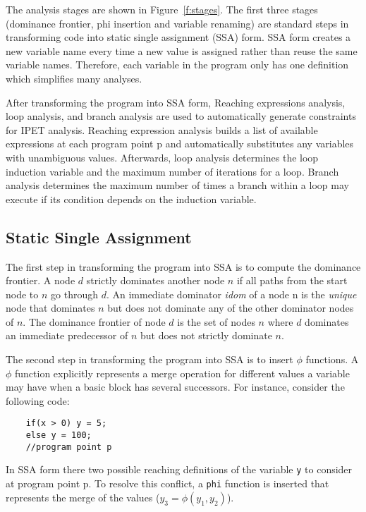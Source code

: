 	The analysis stages are shown in Figure~\ref{f:stages}. 
	The first three stages (dominance frontier, phi insertion and variable renaming) are standard steps in transforming code into static single assignment (SSA) form. 
	SSA form creates a new variable name every time a new value is assigned rather than reuse the same variable names. 
	Therefore, each variable in the program only has one definition which simplifies many analyses.
	
	
	After transforming the program into SSA form, Reaching expressions analysis, loop analysis, and branch analysis are used to automatically generate constraints for IPET analysis. 
	Reaching expression analysis builds a list of available expressions at each program point p and automatically substitutes any variables with unambiguous values. 
	Afterwards, loop analysis determines the loop induction variable and the maximum number of iterations for a loop. 
	Branch analysis determines the maximum number of times a branch within a loop may execute if its condition depends on the induction variable.

\subsection{Static Single Assignment}
	
	The first step in transforming the program into SSA is to compute the dominance frontier. 
	A node $d$ strictly dominates another node $n$ if all paths from the start node to $n$ go through $d$. 
	An immediate dominator \emph{idom} of a node n is the \emph{unique} node that dominates $n$ but does not dominate any of the other dominator nodes of $n$. 
	The dominance frontier of node $d$ is the set of nodes $n$ where $d$ dominates an immediate predecessor of $n$ but does not strictly dominate $n$. 
	
	The second step in transforming the program into SSA is to insert $\phi$ functions. A $\phi$ function explicitly represents a merge operation for different values a variable may have when a basic block has several successors. For instance, consider the following code:
	
	\begin{lstlisting}
	if(x > 0) y = 5;
	else y = 100;
	//program point p
	\end{lstlisting}
	
	In SSA form there two possible reaching definitions of the variable \texttt{y} to consider at program point p. 
	To resolve this conflict, a \texttt{phi} function is inserted that represents the merge of the values ($y_3 = \phi(y_1,y_2)$).

